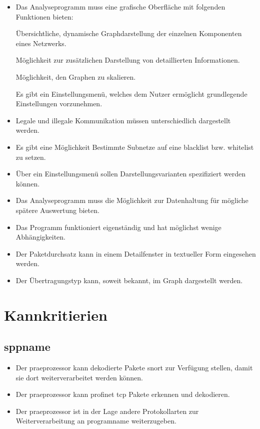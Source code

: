 \begin{itemize}
\item Das Analyseprogramm muss eine grafische Oberfläche mit folgenden Funktionen bieten:

    \subitem Übersichtliche, dynamische Graphdarstellung der einzelnen Komponenten eines Netzwerks.

    \subitem Möglichkeit zur zusätzlichen Darstellung von detaillierten Informationen.

    \subitem Möglichkeit, den Graphen zu skalieren.
    
    \subitem Es gibt ein Einstellungsmenü, welches dem Nutzer ermöglicht grundlegende Einstellungen vorzunehmen.

\item Legale und illegale Kommunikation müssen unterschiedlich dargestellt werden.

\item Es gibt eine Möglichkeit Bestimmte Subnetze auf eine \gls{blacklist} bzw. \gls{whitelist} zu setzen.

\item Über ein Einstellungsmenü sollen Darstellungsvarianten spezifiziert werden können.

\item Das Analyseprogramm muss die Möglichkeit zur Datenhaltung für mögliche spätere Auswertung bieten.

\item Das Programm funktioniert eigenständig und hat möglichst wenige Abhängigkeiten.

\item Der Paketdurchsatz kann in einem Detailfenster in textueller Form eingesehen werden.

\item Der Übertragungstyp kann, soweit bekannt, im Graph dargestellt werden.
\end{itemize}

\section{Kannkritierien}

\subsection{\gls{sppname}}

\begin{itemize}

\item Der \gls{praeprozessor} kann dekodierte Pakete \gls{snort} zur Verfügung stellen, damit sie dort weiterverarbeitet werden können.

\item Der \gls{praeprozessor} kann \gls{profinet} \gls{tcp} Pakete erkennen und dekodieren.

\item Der \gls{praeprozessor} ist in der Lage andere Protokollarten zur Weiterverarbeitung an \gls{programname} weiterzugeben.
\end{itemize}

